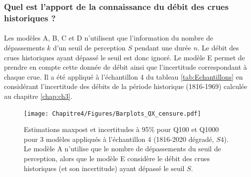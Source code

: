 	\subsubsection{Quel est l'apport de la connaissance du débit des crues historiques ?}

	\paragraph{} Les modèles A, B, C et D n'utilisent que l'information du nombre de dépassements $k$ d'un seuil de perception $S$ pendant une durée $n$. Le débit des crues historiques ayant dépassé le seuil est donc ignoré. Le modèle E permet de prendre en compte cette donnée de débit ainsi que l'incertitude correspondant à chaque crue. Il a été appliqué à l'échantillon 4 du tableau \ref{tab:Echantillons} en considérant l'incertitude des débits de la période historique (1816-1969) calculée au chapitre \ref{chap:ch3}.
	
	
	\begin{figure}[h]
		\centering
		\texttt{[image: Chapitre4/Figures/Barplots\_QX\_censure.pdf]}
		\caption{Estimations maxpost et incertitudes à 95\% pour Q100 et Q1000 pour 3 modèles appliqués à l'échantillon 4 (1816-2020 dégradé, $S4$). Le modèle A n'utilise que le nombre de dépassements du seuil de perception, alors que le modèle E considère le débit des crues historiques (et son incertitude) ayant dépassé le seuil $S$.}
		\label{fig:CensureArtif}
	\end{figure}
	
%		
%	
